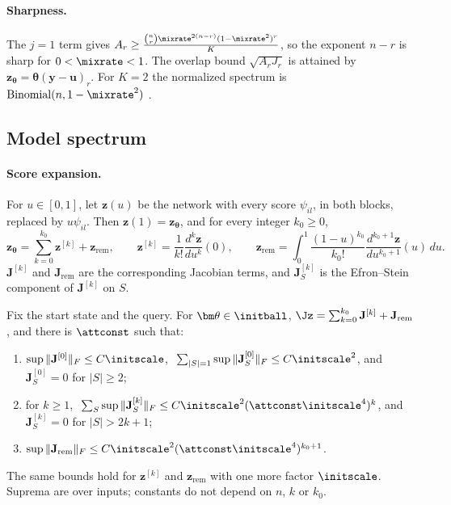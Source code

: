 \paragraph{Sharpness.}\label{rem:tight} The $j=1$ term gives $A_r\ge\frac{\binom nr\mixrate^{2(n-r)}(1-\mixrate^2)^r}{K}$, so the exponent $n-r$ is sharp for $0<\mixrate<1$. The overlap bound
$\sqrt{A_rJ_r}$ is attained by $\bm z_{\bm\theta}=\bm\theta(\bm y-\bm u)_r$. For $K=2$ the normalized spectrum is $\mathrm{Binomial}(n,1-\mixrate^2)$
\citep{odonnell2014analysis}.
\subsection{Model spectrum}
\label{app:model-spectrum}

\paragraph{Score expansion.} For $u\in[0,1]$, let $\bm z(u)$ be the network with every score $\psi_{il}$, in both blocks, replaced by
$u\psi_{il}$. Then $\bm z(1)=\bm z_{\bm\theta}$, and for every integer $k_0\ge0$,
\begin{equation}
 \bm z_{\bm\theta}=\sum_{k=0}^{k_0}\bm z^{[k]}+\bm z_{\mathrm{rem}},\qquad
 \bm z^{[k]}=\frac{1}{k!}\frac{d^k\bm z}{du^k}(0),\qquad
 \bm z_{\mathrm{rem}}=\int_0^1\frac{(1-u)^{k_0}}{k_0!}\frac{d^{k_0+1}\bm z}{du^{k_0+1}}(u)\,du .
 \label{eq:score-split}
\end{equation}
$\mathbf J^{[k]}$ and $\mathbf J_{\mathrm{rem}}$ are the corresponding Jacobian terms, and $\mathbf J^{[k]}_S$ is the Efron--Stein component of $\mathbf J^{[k]}$ on $S$.

\begin{proposition}
\label{prop:score-degree}
Fix the start state and the query. For $\bm\theta\in\initball$, $\Jz=\sum_{k=0}^{k_0}\mathbf J^{[k]}+\mathbf J_{\mathrm{rem}}$, and there is $\attconst$ such that:
\begin{enumerate}[label=(\roman*),leftmargin=*,itemsep=2pt,topsep=2pt]
\item $\sup\|\mathbf J^{[0]}\|_F\le C\initscale$, $\ \sum_{|S|=1}\sup\|\mathbf J^{[0]}_S\|_F\le C\initscale^2$, and $\mathbf J^{[0]}_S=0$ for $|S|\ge2$;
\item for $k\ge1$, $\ \sum_S\sup\|\mathbf J^{[k]}_S\|_F\le C\initscale^2(\attconst\initscale^4)^k$, and $\mathbf J^{[k]}_S=0$ for $|S|>2k+1$;
\item $\sup\|\mathbf J_{\mathrm{rem}}\|_F\le C\initscale^2(\attconst\initscale^4)^{k_0+1}$.
\end{enumerate}
The same bounds hold for $\bm z^{[k]}$ and $\bm z_{\mathrm{rem}}$ with one more factor $\initscale$. Suprema are over inputs; constants do not depend on
$n$, $k$ or $k_0$.
\end{proposition}


